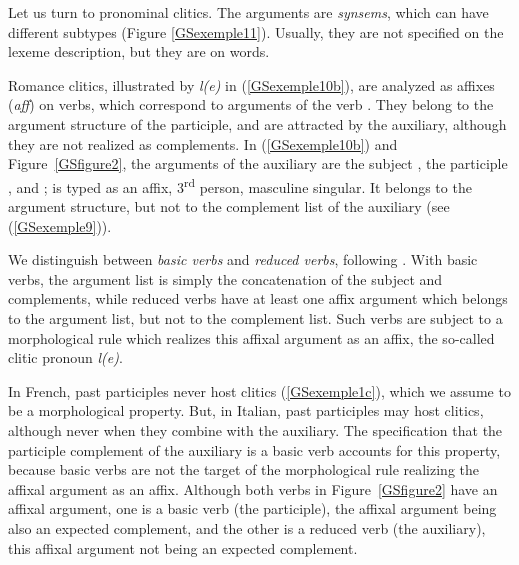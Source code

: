 \documentclass[output=paper
                ,modfonts
                ,nonflat
	        ,collection
	        ,collectionchapter
	        ,collectiontoclongg
 	        ,biblatex
                ,babelshorthands
                ,newtxmath
                ,draftmode
                ,colorlinks, citecolor=brown
]{./langsci/langscibook}
\begin{document}
{Let us turn to pronominal clitics. The arguments are \emph{synsems}, which can have different subtypes (Figure \ref{GSexemple11}). Usually, they are not specified on the lexeme description, but they are on
words.

Romance clitics, illustrated by \emph{l(e)} in (\ref{GSexemple10b}), are analyzed as affixes (\emph{aff}) on verbs, which correspond to arguments of the verb \citep{MS97a-u}. They belong to the argument structure of the participle, and are attracted by the auxiliary, although they are not realized as complements. In (\ref{GSexemple10b}) and Figure~\ref{GSfigure2}, the arguments of the auxiliary are the subject , the participle , and ;  is typed as an affix, 3\textsuperscript{rd} person, masculine singular. It belongs to the argument structure, but not to the complement list of the auxiliary (see (\ref{GSexemple9})).


We distinguish between \emph{basic verbs} and \emph{reduced verbs}, following \cite{AGS1998}. With basic verbs, the argument list is simply the concatenation of the subject and complements, while reduced verbs have at least one affix argument which belongs to the argument list, but not to the complement list. Such verbs are subject to a morphological rule which realizes this affixal argument as an affix, the so-called clitic pronoun \emph{l(e)}.

In French, past participles never host clitics (\ref{GSexemple1c}), which we assume to be a morphological property. But, in Italian, past participles may host clitics, although never when they combine
with the auxiliary. The specification that the participle complement of the auxiliary is a basic verb accounts for this property, because basic verbs are not the target of the morphological rule realizing the affixal argument as an affix. Although both verbs in Figure~\ref{GSfigure2} have an affixal argument, one is a basic verb (the participle), the affixal argument being also an expected complement, and the other is a reduced verb (the auxiliary), this affixal argument not being an expected complement.


}
\end{document}
